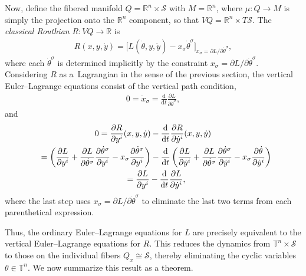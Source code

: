 \documentclass[10pt,a4paper]{amsart}
\numberwithin{equation}{section}
\begin{document}
Now, def\/ine the f\/ibered manifold $ Q = \mathbb{R}^n \times \mathcal{S} $ with $ M = \mathbb{R}^n $, where $ \mu \colon Q \rightarrow M $ is simply the projection onto the $\mathbb{R}^n$ component, so that $ V Q = \mathbb{R}^n \times T \mathcal{S} $. The \emph{classical Routhian} $ R \colon V Q \rightarrow \mathbb{R} $ is
\begin{gather} \label{eqn:classicalRouthian}
 R ( x, y , \dot{y} ) = \bigl[ L ( \dot{\theta} , y, \dot{y} ) - x _\sigma \dot{\theta} ^\sigma \bigr] _{ x _\sigma = \partial L / \partial \dot{\theta} ^\sigma } ,
\end{gather}
where each $ \dot{\theta} ^\sigma $ is determined implicitly by the constraint $ x _\sigma = \partial L / \partial \dot{\theta} ^\sigma $. Considering $R$ as a~Lagrangian in the sense of the previous section, the vertical Euler--Lagrange equations consist of the vertical path condition,
\begin{gather*}
 0 = \dot{x} _\sigma = \frac{\mathrm{d}}{\mathrm{d}t} \frac{ \partial L }{ \partial \dot{\theta} ^\sigma },
\end{gather*}
and
\begin{gather*}
 0 = \frac{ \partial R }{ \partial y ^i } ( x, y , \dot{y} ) - \frac{\mathrm{d}}{\mathrm{d}t} \frac{ \partial R }{ \partial
 \dot{y} ^i } ( x, y , \dot{y} ) \\
\hphantom{0}{}
= \left( \frac{ \partial L }{ \partial y ^i } + \frac{ \partial L }{ \partial \dot{\theta} ^\sigma } \frac{ \partial
 \dot{\theta} ^\sigma }{ \partial y ^i } - x _\sigma
 \frac{ \partial \dot{\theta} ^\sigma }{ \partial y ^i } \right) -\frac{\mathrm{d}}{\mathrm{d}t} \left( \frac{ \partial L
 }{ \partial \dot{y} ^i } + \frac{ \partial L }{ \partial \dot{\theta} ^\sigma } \frac{ \partial \dot{\theta} ^\sigma }{ \partial \dot{y} ^i } -
 x _\sigma \frac{ \partial \dot{\theta} }{ \partial \dot{y} ^i } \right) \\
\hphantom{0}{} = \frac{ \partial L }{ \partial y ^i } - \frac{\mathrm{d}}{\mathrm{d}t} \frac{ \partial L
 }{ \partial \dot{y} ^i },
\end{gather*}
where the last step uses $ x _\sigma = \partial L / \partial \dot{\theta} ^\sigma $ to eliminate the last two terms from each parenthetical expression.

Thus, the ordinary Euler--Lagrange equations for $L$ are precisely equivalent to the vertical Euler--Lagrange equations for $R$. This reduces the dynamics from $\mathbb{T} ^n \times \mathcal{S} $ to those on the individual f\/ibers $ Q _x \cong \mathcal{S} $, thereby eliminating the cyclic variables $\theta \in \mathbb{T} ^n $. We now summarize this result as a theorem.
\end{document}
